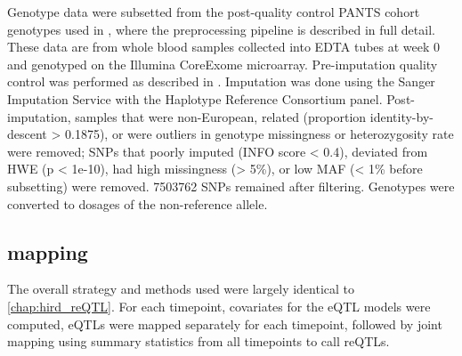 %
%
%
%

Genotype data were subsetted from the post-quality control \gls{PANTS} cohort genotypes used in \textcite{sazonovs2019HLADQA105Carriage},
where the preprocessing pipeline is described in full detail.
These data are from whole blood samples collected into EDTA tubes at week 0 and genotyped on the Illumina CoreExome microarray.
Pre-imputation quality control was performed as described in \textcite{delange2017GenomewideAssociationStudy}.
Imputation was done using the Sanger Imputation Service with the Haplotype Reference Consortium panel.
Post-imputation, samples that were non-European, related (proportion identity-by-descent > 0.1875), or were outliers in genotype missingness or heterozygosity rate were removed;
\glspl{SNP} that poorly imputed (INFO score < 0.4), deviated from \gls{HWE} (p < 1e-10), had high missingness (> 5\%), or low \gls{MAF} (< 1\% before subsetting) were removed.
\num{7503762} \glspl{SNP} remained after filtering.
Genotypes were converted to dosages of the non-reference allele.

\subsection{ mapping}

The overall strategy and methods used were largely identical to \autoref{chap:hird_reQTL}.
For each timepoint, covariates for the \gls{eQTL} models were computed, \glspl{eQTL} were mapped separately for each timepoint, followed by joint mapping using summary statistics from all timepoints to call \glspl{reQTL}.

